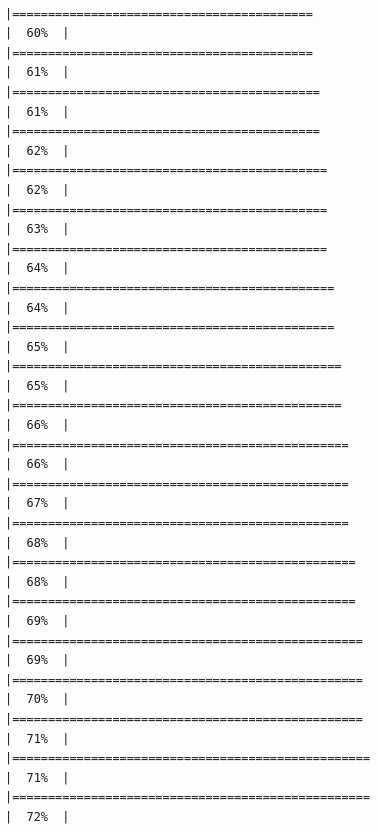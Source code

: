 \documentclass[
  ignorenonframetext,
]{beamer}
\begin{document}
\begin{frame}[fragile]{}
\begin{verbatim}
                                                |==========================================                            |  60%  |                                                                              |==========================================                            |  61%  |                                                                              |===========================================                           |  61%  |                                                                              |===========================================                           |  62%  |                                                                              |============================================                          |  62%  |                                                                              |============================================                          |  63%  |                                                                              |============================================                          |  64%  |                                                                              |=============================================                         |  64%  |                                                                              |=============================================                         |  65%  |                                                                              |==============================================                        |  65%  |                                                                              |==============================================                        |  66%  |                                                                              |===============================================                       |  66%  |                                                                              |===============================================                       |  67%  |                                                                              |===============================================                       |  68%  |                                                                              |================================================                      |  68%  |                                                                              |================================================                      |  69%  |                                                                              |=================================================                     |  69%  |                                                                              |=================================================                     |  70%  |                                                                              |=================================================                     |  71%  |                                                                              |==================================================                    |  71%  |                                                                              |==================================================                    |  72%  |      
\end{verbatim}
\end{frame}
\end{document}
